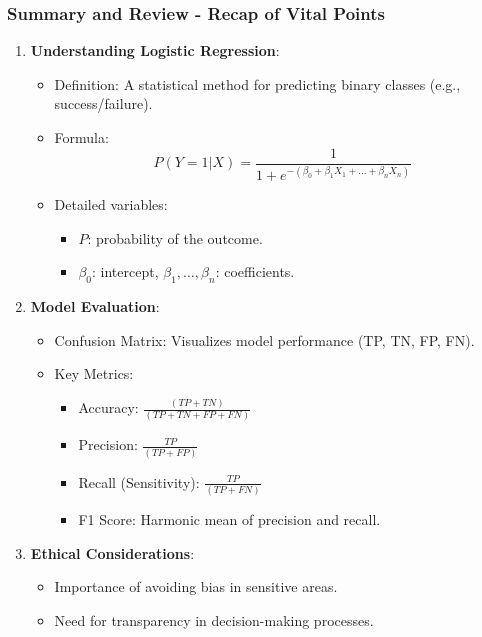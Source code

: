 \documentclass[aspectratio=169]{beamer}
\begin{document}
\begin{frame}[fragile]
    \frametitle{Summary and Review - Recap of Vital Points}
    
    \begin{enumerate}
        \item \textbf{Understanding Logistic Regression}:
        \begin{itemize}
            \item Definition: A statistical method for predicting binary classes (e.g., success/failure).
            \item Formula:
            \begin{equation}
            P(Y=1 | X) = \frac{1}{1 + e^{-(\beta_0 + \beta_1 X_1 + ... + \beta_n X_n)}}
            \end{equation}
            \item Detailed variables:
            \begin{itemize}
                \item \(P\): probability of the outcome.
                \item \(\beta_0\): intercept, \(\beta_1, \ldots, \beta_n\): coefficients.
            \end{itemize}
        \end{itemize}
        
        \item \textbf{Model Evaluation}:
        \begin{itemize}
            \item Confusion Matrix: Visualizes model performance (TP, TN, FP, FN).
            \item Key Metrics:
            \begin{itemize}
                \item Accuracy: \(\frac{(TP + TN)}{(TP + TN + FP + FN)}\)
                \item Precision: \(\frac{TP}{(TP + FP)}\)
                \item Recall (Sensitivity): \(\frac{TP}{(TP + FN)}\)
                \item F1 Score: Harmonic mean of precision and recall.
            \end{itemize}
        \end{itemize}
        
        \item \textbf{Ethical Considerations}:
        \begin{itemize}
            \item Importance of avoiding bias in sensitive areas.
            \item Need for transparency in decision-making processes.
        \end{itemize}
    \end{enumerate}
\end{frame}
\end{document}
